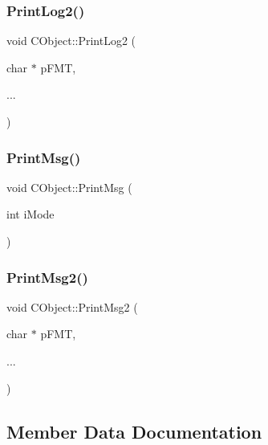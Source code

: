 \subsubsection{\texorpdfstring{PrintLog2()}{PrintLog2()}}
{\footnotesize\ttfamily void C\+Object\+::\+Print\+Log2 (\begin{DoxyParamCaption}\item[{char $\ast$}]{p\+F\+MT,  }\item[{}]{... }\end{DoxyParamCaption})\hspace{0.3cm}{\ttfamily [static]}}

\mbox{\label{classCObject_a3bf81b5d5af59f8b8a6a716591d0f355}} 
\subsubsection{\texorpdfstring{PrintMsg()}{PrintMsg()}}
{\footnotesize\ttfamily void C\+Object\+::\+Print\+Msg (\begin{DoxyParamCaption}\item[{int}]{i\+Mode }\end{DoxyParamCaption})}

\mbox{\label{classCObject_ad03905456a69ab270896976b3dd69e05}} 
\subsubsection{\texorpdfstring{PrintMsg2()}{PrintMsg2()}}
{\footnotesize\ttfamily void C\+Object\+::\+Print\+Msg2 (\begin{DoxyParamCaption}\item[{char $\ast$}]{p\+F\+MT,  }\item[{}]{... }\end{DoxyParamCaption})\hspace{0.3cm}{\ttfamily [static]}}



\subsection{Member Data Documentation}
\mbox{\label{classCObject_a6613f95f1c296f056907e6f64599cdc9}} 
